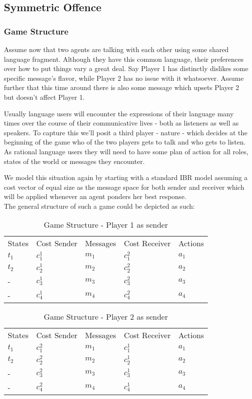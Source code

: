 \documentclass[10]{article}
\begin{document}
\subsection{Symmetric Offence}
\subsubsection{Game Structure}
Assume now that two agents are talking with each other using some shared language fragment. Although they have this common language, their preferences over how to put things vary a great deal. Say Player 1 has distinctly dislikes some specific message's flavor, while Player 2 has no issue with it whatsoever. Assume further that this time around there is also some message which upsets Player 2 but doesn't affect Player 1.

Usually language users will encounter the expressions of their language many times over the course of their communicative lives - both as listeners as well as speakers. To capture this we'll posit a third player - nature - which decides at the beginning of the game who of the two players gets to talk and who gets to listen. As rational language users they will need to have some plan of action for all roles, states of the world or messages they encounter.

We model this situation again by starting with a standard IBR model assuming a cost vector of equal size as the message space for both sender and receiver which will be applied whenever an agent ponders her best response. \\
The general structure of such a game could be depicted as such: %
\begin{table}[h]
\centering
\caption{Game Structure - Player 1 as sender}
\label{my-label}
\begin{tabular}{lllll}
States & Cost Sender & Messages & Cost Receiver & Actions \\
$t_1$  & $c^1_1$      & $m_1$    & $c^2_1$        & $a_1$   \\
$t_2$  & $c^1_2$      & $m_2$    & $c^2_2$        & $a_2$  \\
- & $c^1_3$ 		&$m_3$	& $c^2_3$		& $a_3$ \\
- & $c^1_4$ 		&$m_4$	& $c^2_4$		& $a_4$
\end{tabular}
\end{table}
\begin{table}[h]
\centering
\caption{Game Structure - Player 2 as sender}
\label{my-label}
\begin{tabular}{lllll}
States & Cost Sender & Messages & Cost Receiver & Actions \\
$t_1$  & $c^2_1$      & $m_1$    & $c^1_1$        & $a_1$   \\
$t_2$  & $c^2_2$      & $m_2$    & $c^1_2$        & $a_2$  \\
- & $c^2_3$ 		&$m_3$	& $c^1_3$		& $a_3$ \\
- & $c^2_4$ 		&$m_4$	& $c^1_4$		& $a_4$
\end{tabular}
\end{table}
\end{document}
